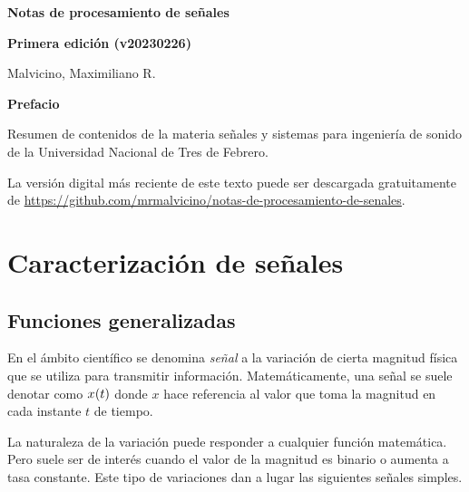 \documentclass[a5paper,12pt,twoside]{book}
\begin{document}
\pagestyle{fancy}
\fancyhf{}
\chead{\scriptsize \nouppercase\rightmark}
\cfoot{\scriptsize \thepage}
\renewcommand{\headrulewidth}{0pt}

\frontmatter
% 

\begin{center}
    \begin{Huge}
        \textbf{Notas de procesamiento de señales}
    \end{Huge}

    \vspace{1cm}
    \textbf{Primera edición (v20230226)}
    \vspace{2cm}

    \begin{Large}
        Malvicino, Maximiliano R.
    \end{Large}
\end{center}

\clearpage
\noindent
\textbf{Prefacio}

Resumen de contenidos de la materia señales y sistemas para ingeniería de sonido de la Universidad Nacional de Tres de Febrero.

La versión digital más reciente de este texto puede ser descargada gratuitamente de \url{https://github.com/mrmalvicino/notas-de-procesamiento-de-senales}.

\renewcommand{\spanishappendixname}{Anexo}
\tableofcontents

\mainmatter
{}


\chapter{Caracterización de señales}


\section{Funciones generalizadas}

En el ámbito científico se denomina \emph{señal} a la variación de cierta magnitud física que se utiliza para transmitir información. Matemáticamente, una señal se suele denotar como $\fx[x]{t}$ donde $x$ hace referencia al valor que toma la magnitud en cada instante $t$ de tiempo.

La naturaleza de la variación puede responder a cualquier función matemática. Pero suele ser de interés cuando el valor de la magnitud es binario o aumenta a tasa constante. Este tipo de variaciones dan a lugar las siguientes señales simples.
\end{document}
